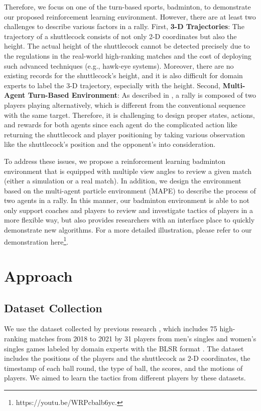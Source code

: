 \documentclass[letterpaper]{article} %
\begin{document}
Therefore, we focus on one of the turn-based sports, badminton, to demonstrate our proposed reinforcement learning environment.
However, there are at least two challenges to describe various factors in a rally.
First, \textbf{3-D Trajectories}: The trajectory of a shuttlecock consists of not only 2-D coordinates but also the height.
The actual height of the shuttlecock cannot be detected precisely due to the regulations in the real-world high-ranking matches and the cost of deploying such advanced techniques (e.g., hawk-eye systems).
Moreover, there are no existing records for the shuttlecock's height, and it is also difficult for domain experts to label the 3-D trajectory, especially with the height.
Second, \textbf{Multi-Agent Turn-Based Environment}: As described in \cite{DBLP:conf/aaai/WangSCP22}, a rally is composed of two players playing alternatively, which is different from the conventional sequence with the same target.
Therefore, it is challenging to design proper states, actions, and rewards for both agents since each agent do the complicated action like returning the shuttlecock and player positioning by taking various observation like the shuttlecock's position and the opponent's into consideration.

To address these issues, we propose a reinforcement learning badminton environment that is equipped with multiple view angles to review a given match (either a simulation or a real match).
In addition, we design the environment based on the multi-agent particle environment (MAPE)  \cite{NIPS2017_68a97503} to describe the process of two agents in a rally.
In this manner, our badminton environment is able to not only support coaches and players to review and investigate tactics of players in a more flexible way, but also provides researchers with an interface place to quickly demonstrate new algorithms.
For a more detailed illustration, please refer to our demonstration here\footnote{https://youtu.be/WRPcbalb6yc.}.

\section{Approach}

\subsection{Dataset Collection}
We use the dataset collected by previous research \cite{DBLP:conf/aaai/WangSCP22}, which includes 75 high-ranking matches from 2018 to 2021 by 31 players from men's singles and women's singles games labeled by domain experts with the BLSR format \cite{DBLP:conf/icdm/WangCYWFP21,10.1145/3551391}.
The dataset includes the positions of the players and the shuttlecock as 2-D coordinates, the timestamp of each ball round, the type of ball, the scores, and the motions of players.
We aimed to learn the tactics from different players by these datasets.
\end{document}
